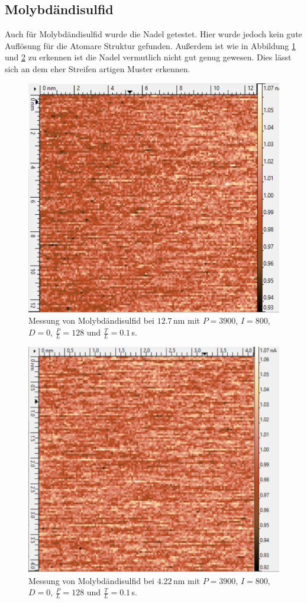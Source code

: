 \subsection{Molybdändisulfid}
Auch für Molybdändisulfid wurde die Nadel getestet. Hier wurde jedoch kein gute Auflösung für die Atomare Struktur gefunden. Außerdem ist wie in Abbildung \ref{Mol} und \ref{Mol2} zu erkennen ist die Nadel vermutlich nicht gut genug gewesen. Dies lässt sich an dem eher Streifen artigen Muster erkennen.
\begin{figure}[ht]
	\includegraphics[scale=0.62]{Bild/Mol}
	\centering
	\caption[Messung von Molybdändisulfid 1]{Messung von Molybdändisulfid bei $12.7\,$nm mit $P=3900$, $I=800$, $D=0$, $\frac{P}{L}=128$ und $\frac{T}{L}=0.1\,$s.}
	\label{Mol}
\end{figure}
\begin{figure}[ht]
	\includegraphics[scale=0.57]{Bild/Mol2}
	\centering
	\caption[Messung von Molybdändisulfid 2]{Messung von Molybdändisulfid bei $4.22\,$nm mit $P=3900$, $I=800$, $D=0$, $\frac{P}{L}=128$ und $\frac{T}{L}=0.1\,$s.}
	\label{Mol2}
\end{figure}
